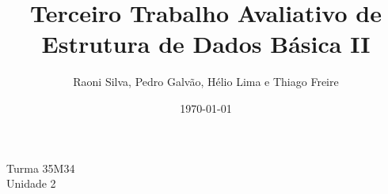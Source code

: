 \documentclass[a4paper,12pt]{article}
\title{Terceiro Trabalho Avaliativo de Estrutura de Dados Básica II}
\author{Raoni Silva, Pedro Galvão, Hélio Lima e Thiago Freire}
\date{\today}
\begin{document}
\maketitle

\noindent Turma 35M34 \\ Unidade 2

\newpage

\tableofcontents



\end{document}
